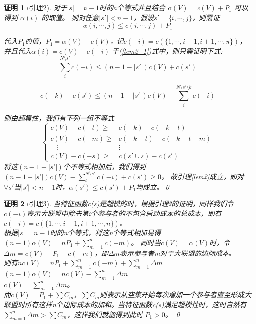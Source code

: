 \documentclass[UTF8]{article}
\newtheorem{pf}{\hspace{2em}证明}
\begin{document}
\begin{pf}[引理2]

对于$\left| s \right|= n-1 $时的n个等式并且结合 $\alpha(V)=c(V)+P_1$ 可以得到 $\alpha(i)$ 的取值。
则对任意$\left| s' \right| < n-1$，假设$s'=\{i,\cdots,j\}$，则需证
\begin{equation} \label{lem2_1}
  \alpha(i,\cdots,j) \leq c(i,\cdots,j)+P_1
\end{equation}

代入$P_1$的值，$P_1=\alpha(V)-c(V)$，记$c(-i)=c(\{1,\cdots,i-1,i+1,\cdots,n\})$，并且代入$\alpha(i) = c(V)-c(-i)$ 于(\ref{lem2_1})式中，则只需证明下式:
\begin{equation}   \label{lem2_2}
  \sum_i^{N\setminus s'} c(-i) \leq (n-1-\left| s' \right|)c(V)+c(s')
\end{equation}

\Rightarrow \qquad

\begin{equation*}
  c(-k)-c(s') \leq (n-1-\left| s' \right|)c(V)-\sum_i^{N\setminus s'\setminus k} c(-i)
\end{equation*}

则由超模性，我们有下列一组不等式
\[
\begin{cases}
  c(V)-c(-t) \geq & c(-k)-c(-k-t) \\
  c(V)-c(-m) \geq & c(-k-t)-c(-k-t-m) \\
 \quad   \vdots        &\vdots\\
 c(V)-c(-s) \geq & c(s' \cup s)-c(s')
\end{cases}
\]
将这$(n-1-\left| s' \right|)$个不等式相加后，我们得到
$(n-1-\left| s' \right|)c(V)- \sum_i^{N\setminus s'} c(-i)+c(s') \geq 0 $。
故引理\ref{lem2}成立，即对$\forall s'$当$\left|s' \right|<n-1$时，$\alpha(s') \leq c(s')+P_1$均成立。\qed

\end{pf}


\begin{pf}[引理3]

当特征函数c(s)是超模的时，根据引理2的证明，同样我们令$c(-i)$表示大联盟中除去第i个参与者的不包含启动成本的总成本，即有$c(-i)=c(\{1,\cdots,i-1,i+1,\cdots,n\})$。\\
根据$\left| s \right|= n-1 $时的n个等式，将这n个等式相加易得$(n-1)\alpha(V)=nP_1+ \sum_{m=1}^n c(-m)$。
同时当$c(V)=\alpha(V)$时，令$\Delta m=c(V)-P_1-c(-m)$，即$\Delta m$表示参与者m对于大联盟的边际成本。\\
则有$nc(V)=nP_1+\sum_{m=1}^n c(-m) +\sum_{m=1}^n \Delta m$ \\
\Rightarrow  \qquad  $(n-1)\alpha(V)=nc(V)-\sum_{m=1}^n \Delta m$ \\
\Rightarrow   \qquad  $c(V)= \sum_{m=1}^n \Delta m$。 \\
而$c(V)=P_1+\sum C_m$，$\sum C_m $则表示从空集开始每次增加一个参与者直至形成大联盟时所有这样n个边际成本的加和。当特征函数c(s)满足超模性时，这时自然有$\sum_{m=1}^n \Delta m > \sum C_m$，这样我们就能得到此时 $P_1 > 0$。
\qed
\end{pf}
\end{document}
